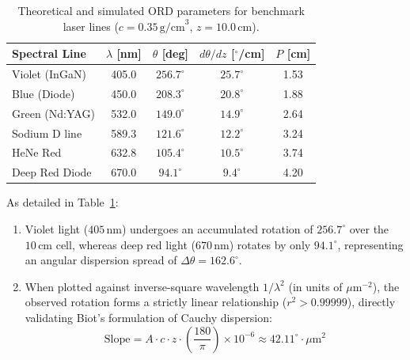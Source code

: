 \documentclass[twocolumn,10pt,a4paper]{article}
\begin{document}
\begin{table}[h]
  \centering
  \footnotesize
  \setlength{\tabcolsep}{3.5pt}
  \caption{Theoretical and simulated ORD parameters for benchmark laser lines ($c = 0.35\,\text{g/cm}^3$, $z = 10.0\,\text{cm}$).}
  \label{tab:laser_parameters}
  \begin{tabular}{lcccc}
    \toprule
    \textbf{Spectral Line} & $\lambda$ [nm] & $\theta$ [deg] & $d\theta/dz$ [$^\circ$/cm] & $P$ [cm] \\
    \midrule
    Violet (InGaN)  & 405.0 & $256.7^\circ$ & $25.7^\circ$ & 1.53 \\
    Blue (Diode)    & 450.0 & $208.3^\circ$ & $20.8^\circ$ & 1.88 \\
    Green (Nd:YAG)  & 532.0 & $149.0^\circ$ & $14.9^\circ$ & 2.64 \\
    Sodium D line   & 589.3 & $121.6^\circ$ & $12.2^\circ$ & 3.24 \\
    HeNe Red        & 632.8 & $105.4^\circ$ & $10.5^\circ$ & 3.74 \\
    Deep Red Diode  & 670.0 & $94.1^\circ$  & $9.4^\circ$  & 4.20 \\
    \bottomrule
  \end{tabular}
\end{table}

As detailed in Table~\ref{tab:laser_parameters}:
\begin{enumerate}[leftmargin=*]
  \item Violet light ($405\,\text{nm}$) undergoes an accumulated rotation of $256.7^\circ$ over the $10\,\text{cm}$ cell, whereas deep red light ($670\,\text{nm}$) rotates by only $94.1^\circ$, representing an angular dispersion spread of $\Delta\theta = 162.6^\circ$.
  \item When plotted against inverse-square wavelength $1/\lambda^2$ (in units of $\mu\text{m}^{-2}$), the observed rotation forms a strictly linear relationship ($r^2 > 0.99999$), directly validating Biot's formulation of Cauchy dispersion:
  \begin{equation}
    \text{Slope} = A \cdot c \cdot z \cdot \left(\frac{180}{\pi}\right) \times 10^{-6} \approx 42.11^\circ\cdot\mu\text{m}^2
  \end{equation}
\end{enumerate}
\end{document}
